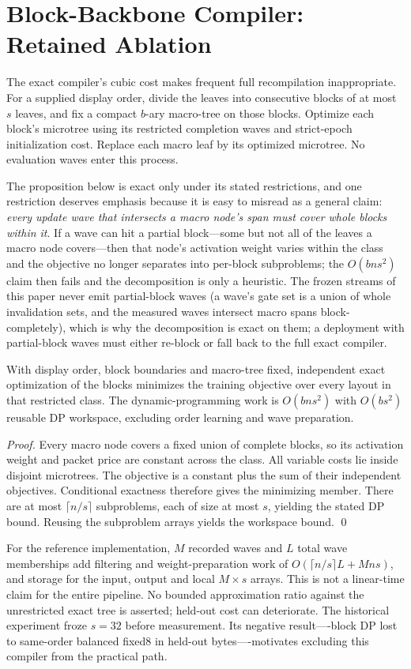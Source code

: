 \section{Block-Backbone Compiler: Retained Ablation}\label{app:block}
The exact compiler's cubic cost makes frequent full recompilation inappropriate.
For a supplied display order, divide the leaves into consecutive blocks of at most
$s$ leaves, and fix a compact $b$-ary macro-tree on those blocks. Optimize each
block's microtree using its restricted completion waves and strict-epoch
initialization cost. Replace each macro leaf by its optimized microtree. No
evaluation waves enter this process.

The proposition below is exact only under its stated restrictions, and one
restriction deserves emphasis because it is easy to misread as a general
claim: \emph{every update wave that intersects a macro node's span must
cover whole blocks within it}. If a wave can hit a partial block---some
but not all of the leaves a macro node covers---then that node's
activation weight varies within the class and the objective no longer
separates into per-block subproblems; the $O(bns^2)$ claim then fails
and the decomposition is only a heuristic. The frozen streams of this
paper never emit partial-block waves (a wave's gate set is a union of
whole invalidation sets, and the measured waves intersect macro spans
block-completely), which is why the decomposition is exact on them; a
deployment with partial-block waves must either re-block or fall back
to the full exact compiler.

\begin{proposition}\label{prop:block}
With display order, block boundaries and macro-tree fixed, independent exact
optimization of the blocks minimizes the training objective over every layout in
that restricted class. The dynamic-programming work is $O(bns^2)$ with $O(bs^2)$
reusable DP workspace, excluding order learning and wave preparation.
\end{proposition}
\begin{proof}
Every macro node covers a fixed union of complete blocks, so its activation weight
and packet price are constant across the class. All variable costs lie inside
disjoint microtrees. The objective is a constant plus the sum of their independent
objectives. Conditional exactness therefore gives the minimizing member. There are
at most $\lceil n/s\rceil$ subproblems, each of size at most $s$, yielding the
stated DP bound. Reusing the subproblem arrays yields the workspace bound. \qed
\end{proof}
For the reference implementation, $M$ recorded waves and $L$ total wave
memberships add filtering and weight-preparation work of
$O(\lceil n/s\rceil L+Mn s)$, and storage for the input, output and local $M\times
s$ arrays. This is not a linear-time claim for the entire pipeline. No bounded
approximation ratio against the unrestricted exact tree is asserted; held-out cost
can deteriorate. The historical experiment froze $s=32$ before measurement. Its
negative result----block DP lost to same-order balanced fixed8 in held-out
bytes----motivates excluding this compiler from the practical path.

